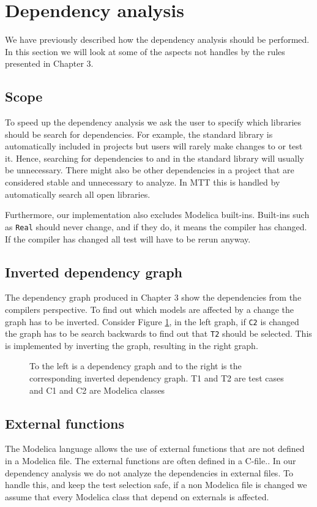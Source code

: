 \documentclass{cslthse-msc}
\begin{document}
\section{Dependency analysis}
We have previously described how the dependency analysis should be performed. In this section we will look at some of the aspects not handles by the rules presented in Chapter 3.

\subsection{Scope}
To speed up the dependency analysis we ask the user to specify which libraries should be search for dependencies. For example, the standard library is automatically included in projects but users will rarely make changes to or test it. Hence, searching for dependencies to and in the standard library will usually be unnecessary. There might also be other dependencies in a project that are considered stable and unnecessary to analyze. In MTT this is handled by automatically search all open libraries.

Furthermore, our implementation also excludes Modelica built-ins. Built-ins such as \texttt{Real} should never change, and if they do, it means the compiler has changed. If the compiler has changed all test will have to be rerun anyway.

\subsection{Inverted dependency graph}
The dependency graph produced in Chapter 3 show the dependencies from the compilers perspective. To find out which models are affected by a change the graph has to be inverted. Consider Figure \ref{fig:invertedGraph}, in the left graph, if \texttt{C2} is changed the graph has to be search backwards to find out that \texttt{T2} should be selected. This is implemented by inverting the graph, resulting in the right graph.

\begin{figure}[!htbp]
    \centering
    \qquad
    \caption{To the left is a dependency graph and to the right is the corresponding inverted dependency graph. T1 and T2 are test cases and C1 and C2 are Modelica classes}
    \label{fig:invertedGraph}
\end{figure}

\subsection{External functions}
The Modelica language allows the use of external functions that are not defined in a Modelica file. The external functions are often defined in a C-file.\cite{modelicamodelica}. In our dependency analysis we do not analyze the dependencies in external files. To handle this, and keep the test selection safe, if a non Modelica file is changed we assume that every Modelica class that depend on externals is affected.
\end{document}
